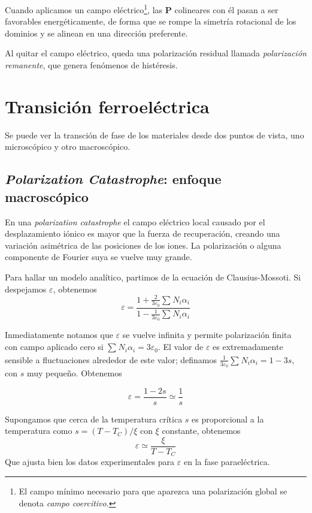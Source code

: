 \documentclass{tufte-book}
\newcommand{\sub}[1]{_{{\scriptscriptstyle\mathit{#1}}}}
\begin{document}
Cuando aplicamos un campo eléctrico\footnote{El campo mínimo necesario
para que aparezca una polarización global se denota \emph{campo
coercitivo}.}, las $\symbf{P}$ colineares con él pasan a ser
favorables energéticamente, de forma que se rompe la simetría
rotacional de los dominios y se alinean en una dirección preferente.

Al quitar el campo eléctrico, queda una polarización residual llamada
\emph{polarización remanente}, que genera fenómenos de histéresis.

\section{Transición ferroeléctrica}
Se puede ver la transción de fase de los materiales desde dos puntos
de vista, uno microscópico y otro macroscópico.

\subsection{\textit{Polarization Catastrophe}: enfoque macroscópico}
En una \textit{polarization catastrophe} el campo eléctrico local
causado por el desplazamiento iónico es mayor que la fuerza de
recuperación, creando una variación asimétrica de las posiciones de
los iones. La polarización o alguna componente de Fourier suya se
vuelve muy grande.

Para hallar un modelo analítico, partimos de la ecuación de
Clausius-Mossoti. Si despejamos $ε$, obtenemos
\begin{equation}
  ε = \frac{1 + \frac{2}{3ε_0} \sum_{} N_i α_i }{1 - \frac{1}{3ε_0} \sum_{} N_i α_i }
\end{equation}

Inmediatamente notamos que $ε$ se vuelve infinita y permite
polarización finita con campo aplicado cero si $\sum_{} N_i α_i =
3ε_0$. El valor de $ε$ es extremadamente sensible a fluctuaciones
alrededor de este valor; definamos $\frac{1}{3ε_0} \sum_{} N_i α_i =
1-3s$, con $s$ muy pequeño. Obtenemos

\begin{equation}
  ε = \frac{1- 2s}{s} ≃ \frac{1}{s}
\end{equation}

Supongamos que cerca de la temperatura crítica $s$ es proporcional a
la temperatura como $s=(T-T\sub{C})/ξ$ con $ξ$ constante, obtenemos
\begin{equation}
  ε ≃ \frac{ξ}{T-T\sub{C}}
\end{equation}
Que ajusta bien los datos experimentales para $ε$ en la fase paraeléctrica.
\end{document}
